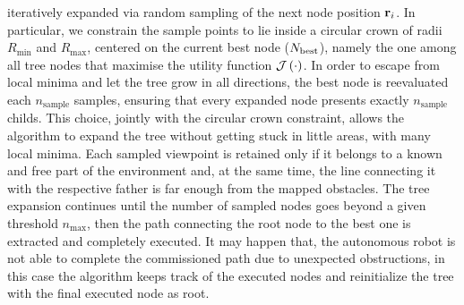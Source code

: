 iteratively expanded via random sampling of the next node position $\mathbf{r}_i$. In particular, we constrain the sample points to lie
inside a circular crown of radii $R_{\text{min}}$ and $R_{\text{max}}$, centered on the current best node ($N_{\text{best}}$),
namely the one among all tree nodes that maximise the utility function $\mathcal{J} \left( \cdot \right)$. In order to escape from local minima
and let the tree grow in all directions, the best node is reevaluated each $n_{\text{sample}}$ samples, ensuring that every expanded
node presents exactly $n_{\text{sample}}$ childs. This choice, jointly with the circular crown constraint, allows the algorithm to
expand the tree without getting stuck in little areas, with many local minima.
Each sampled viewpoint is retained only if it belongs to a known and free part of the environment and, at the same time, the line
connecting it with the respective father is far enough from the mapped obstacles. The tree expansion continues until
the number of sampled nodes goes beyond a given threshold $n_{\text{max}}$, then the path connecting the root node to the best one
is extracted and completely executed. It may happen that, the autonomous robot is not able to complete the commissioned path due 
to unexpected obstructions, in this case the algorithm keeps track of the executed nodes and reinitialize the tree with the 
final executed node as root.

